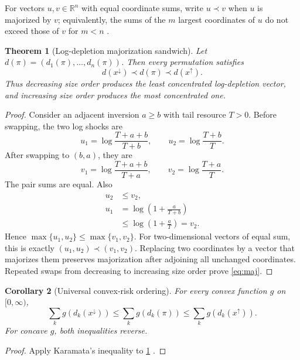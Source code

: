 \documentclass[pdflatex,iicol,sn-basic]{sn-jnl}
\theoremstyle{thmstyleone}
\newtheorem{theorem}{Theorem}[section]
\newtheorem{corollary}[theorem]{Corollary}
\theoremstyle{thmstyletwo}
\theoremstyle{thmstylethree}
\newcommand{\R}{\mathbb{R}}
\begin{document}
For vectors \(u,v\in\R^n\) with equal coordinate sums, write \(u\prec v\) when
\(u\) is majorized by \(v\); equivalently, the sums of the \(m\) largest
coordinates of \(u\) do not exceed those of \(v\) for \(m<n\)
\citep{MarshallOlkinArnold2011}.

\begin{theorem}[Log-depletion majorization sandwich]
\label{thm:maj}
Let \(d(\pi)=(d_1(\pi),\ldots,d_n(\pi))\). Then every permutation satisfies
\begin{equation}\label{eq:maj}
d(x^{\downarrow})\prec d(\pi)\prec d(x^{\uparrow}).
\end{equation}
Thus decreasing size order produces the least concentrated log-depletion
vector, and increasing size order produces the most concentrated one.
\end{theorem}

\begin{proof}
Consider an adjacent inversion \(a\ge b\) with tail resource \(T>0\). Before
swapping, the two log shocks are
\[
u_1=\log\frac{T+a+b}{T+b},
\qquad
u_2=\log\frac{T+b}{T}.
\]
After swapping to \((b,a)\), they are
\[
v_1=\log\frac{T+a+b}{T+a},
\qquad
v_2=\log\frac{T+a}{T}.
\]
The pair sums are equal. Also
\[
\begin{aligned}
u_2&\le v_2,\\
u_1&=\log\left(1+\frac{a}{T+b}\right)\\
&\le\log\left(1+\frac{a}{T}\right)=v_2.
\end{aligned}
\]
Hence \(\max\{u_1,u_2\}\le\max\{v_1,v_2\}\). For two-dimensional vectors of
equal sum, this is exactly \((u_1,u_2)\prec(v_1,v_2)\). Replacing two
coordinates by a vector that majorizes them preserves majorization after
adjoining all unchanged coordinates. Repeated swaps from decreasing to
increasing size order prove \eqref{eq:maj}.
\end{proof}

\begin{corollary}[Universal convex-risk ordering]
\label{cor:convex}
For every convex function \(g\) on \([0,\infty)\),
\[
\sum_k g(d_k(x^{\downarrow}))
\le
\sum_k g(d_k(\pi))
\le
\sum_k g(d_k(x^{\uparrow})).
\]
For concave \(g\), both inequalities reverse.
\end{corollary}

\begin{proof}
Apply Karamata's inequality to \cref{thm:maj}
\citep{HardyLittlewoodPolya1952,MarshallOlkinArnold2011}.
\end{proof}
\end{document}
